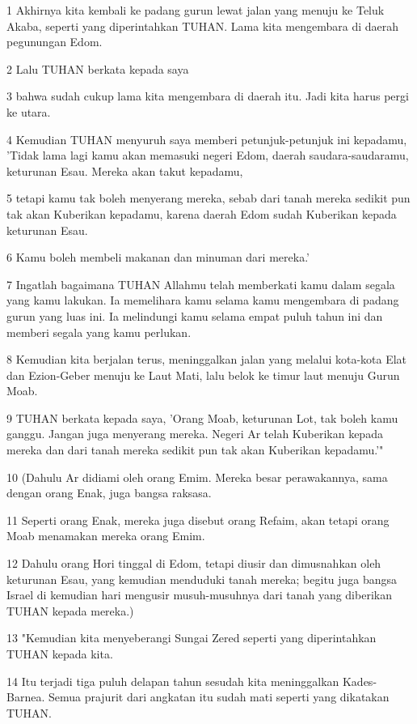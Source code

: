 \par 1 Akhirnya kita kembali ke padang gurun lewat jalan yang menuju ke Teluk Akaba, seperti yang diperintahkan TUHAN. Lama kita mengembara di daerah pegunungan Edom.
\par 2 Lalu TUHAN berkata kepada saya
\par 3 bahwa sudah cukup lama kita mengembara di daerah itu. Jadi kita harus pergi ke utara.
\par 4 Kemudian TUHAN menyuruh saya memberi petunjuk-petunjuk ini kepadamu, 'Tidak lama lagi kamu akan memasuki negeri Edom, daerah saudara-saudaramu, keturunan Esau. Mereka akan takut kepadamu,
\par 5 tetapi kamu tak boleh menyerang mereka, sebab dari tanah mereka sedikit pun tak akan Kuberikan kepadamu, karena daerah Edom sudah Kuberikan kepada keturunan Esau.
\par 6 Kamu boleh membeli makanan dan minuman dari mereka.'
\par 7 Ingatlah bagaimana TUHAN Allahmu telah memberkati kamu dalam segala yang kamu lakukan. Ia memelihara kamu selama kamu mengembara di padang gurun yang luas ini. Ia melindungi kamu selama empat puluh tahun ini dan memberi segala yang kamu perlukan.
\par 8 Kemudian kita berjalan terus, meninggalkan jalan yang melalui kota-kota Elat dan Ezion-Geber menuju ke Laut Mati, lalu belok ke timur laut menuju Gurun Moab.
\par 9 TUHAN berkata kepada saya, 'Orang Moab, keturunan Lot, tak boleh kamu ganggu. Jangan juga menyerang mereka. Negeri Ar telah Kuberikan kepada mereka dan dari tanah mereka sedikit pun tak akan Kuberikan kepadamu.'"
\par 10 (Dahulu Ar didiami oleh orang Emim. Mereka besar perawakannya, sama dengan orang Enak, juga bangsa raksasa.
\par 11 Seperti orang Enak, mereka juga disebut orang Refaim, akan tetapi orang Moab menamakan mereka orang Emim.
\par 12 Dahulu orang Hori tinggal di Edom, tetapi diusir dan dimusnahkan oleh keturunan Esau, yang kemudian menduduki tanah mereka; begitu juga bangsa Israel di kemudian hari mengusir musuh-musuhnya dari tanah yang diberikan TUHAN kepada mereka.)
\par 13 "Kemudian kita menyeberangi Sungai Zered seperti yang diperintahkan TUHAN kepada kita.
\par 14 Itu terjadi tiga puluh delapan tahun sesudah kita meninggalkan Kades-Barnea. Semua prajurit dari angkatan itu sudah mati seperti yang dikatakan TUHAN.
